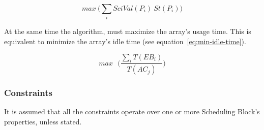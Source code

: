 \begin{equation}
\label{eq:max-sci-value}
max \: \bigg(\sum_{i} SciVal(P_i) \: St(P_i)\bigg)
\end{equation}

At the same time the algorithm, must maximize the array's usage time. This is equivalent to minimize the array's idle time (see equation~\ref{eq:min-idle-time}).

\begin{equation}
\label {eq:min-idle-time}
max \mbox{ }\Bigg( \frac{\sum_{i}T(EB_i)}{T(AC_j)}\Bigg)
\end{equation}


\subsubsection{Constraints}

It is assumed that all the constraints operate over one or more Scheduling Block's properties, unless stated.


